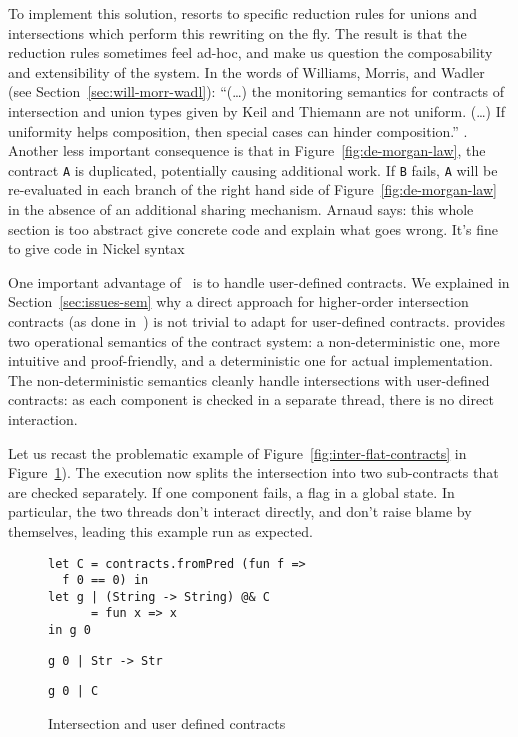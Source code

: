\documentclass[sigplan,10pt,review,anonymous]{acmart}
\newcommand{\unsure}[2][1=]{}
\newcommand{\resolved}[2]{}
\newcommand{\nickel}[1]{\lstinline[language=nickel]{#1}}
\begin{document}
To implement this solution, \cite{KeilThiemannUnionIntersection} resorts to
specific reduction rules for unions and intersections which perform this
rewriting on the fly. The result is that the reduction rules sometimes feel
ad-hoc, and make us question the composability and extensibility of the system.
In the words of Williams, Morris, and Wadler (see
Section~\ref{sec:will-morr-wadl}): ``(\ldots) the monitoring semantics for
contracts of intersection and union types given by Keil and Thiemann are not
uniform. (\ldots) If uniformity helps composition, then special cases can hinder
composition.'' \cite{RootCauseOfBlame}. Another less important consequence is
that in Figure~\ref{fig:de-morgan-law}, the contract \nickel{A} is duplicated,
potentially causing additional work. If \nickel{B} fails, \nickel{A} will be
re-evaluated in each branch of the right hand side of
Figure~\ref{fig:de-morgan-law} in the absence of an additional sharing
mechanism.
\resolved{(Yann) Does
it also make it less efficient? If $(A \cap B)$ fails because of $B$, their
development causes to recheck the contract $A$ that has been duplicated?}
\unsure{Arnaud says: this whole
section is too abstract give concrete code and explain what goes
wrong. It's fine to give code in Nickel syntax}

One important advantage of~\cite{KeilThiemannUnionIntersection} is to handle
user-defined contracts. We explained in Section~\ref{sec:issues-sem} why a
direct approach for higher-order intersection contracts (as done
in~\cite{RootCauseOfBlame}) is not trivial to adapt for user-defined contracts.
\cite{KeilThiemannUnionIntersection} provides two operational semantics of the
contract system: a non-deterministic one, more intuitive and proof-friendly, and
a deterministic one for actual implementation. The non-deterministic semantics
cleanly handle intersections with user-defined contracts: as each component is
checked in a separate thread, there is no direct interaction.

Let us recast the problematic example of Figure~\ref{fig:inter-flat-contracts}
in Figure~\ref{fig:inter-flat-contracts-2}). The execution now splits the
intersection into two sub-contracts that are checked separately. If one
component fails, a flag in a global state. In particular, the two threads don't
interact directly, and don't raise blame by themselves, leading this example run
as expected.

\begin{figure}[h]
\begin{lstlisting}[language=nickel,title={Original program}]
let C = contracts.fromPred (fun f =>
  f 0 == 0) in
let g | (String -> String) @& C
      = fun x => x
in g 0
\end{lstlisting}
\begin{lstlisting}[numbers=none,title={First component}]
g 0 | Str -> Str
\end{lstlisting}
\begin{lstlisting}[numbers=none,title={Second component}]
g 0 | C
\end{lstlisting}
\caption{Intersection and user defined contracts}
\label{fig:inter-flat-contracts-2}
\end{figure}
\end{document}
